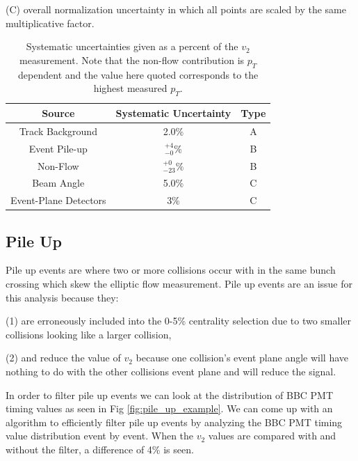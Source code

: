 (C) overall normalization uncertainty in which all points are scaled by the same multiplicative factor.

\begin{table}[!h]
  \begin{center}
  \caption{\label{t:sys}Systematic uncertainties given as a percent of the $v_2$ measurement. Note that the non-flow contribution is $p_T$ dependent and the value here quoted corresponds to the highest measured $p_T$.}
    \begin{tabular}{ccc}
      \hline
      \hline
      Source& Systematic Uncertainty & Type \\ \hline
      Track Background &2.0\%& A\\ 
      Event Pile-up    &$^{+4}_{-0}\%$& B\\
      Non-Flow    &$^{+0}_{-23}\%$& B\\
      Beam Angle &5.0\%& C\\  
      Event-Plane Detectors & 3\% & C\\
    \hline
    \hline
    \end{tabular}
   \end{center}
 \end{table}

\subsection{Pile Up}
Pile up events are where two or more collisions occur with in the same bunch crossing which skew the elliptic flow measurement. Pile up events are an issue for this analysis because they:

(1) are erroneously included into the 0-5\% centrality selection due to two smaller collisions looking like a larger collision,

(2) and reduce the value of $v_2$ because one collision's event plane angle will have nothing to do with the other collisions event plane and will reduce the signal.

In order to filter pile up events we can look at the distribution of BBC PMT timing values as seen in Fig \ref{fig:pile_up_example}. We can come up with an algorithm to efficiently filter pile up events by analyzing the BBC PMT timing value distribution event by event. When the $v_2$ values are compared with and without the filter, a difference of 4\% is seen.

